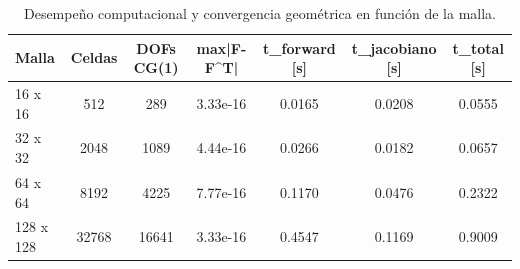 \begin{table}[htbp]
\centering
\caption{Desempeño computacional y convergencia geométrica en función de la malla.}
\label{tab:desempeno_malla}
\begin{tabular}{lcccccc}
\hline
Malla & Celdas & DOFs CG(1) & max|F-F^T| & t_forward [s] & t_jacobiano [s] & t_total [s] \\
\hline
16 x 16 & 512 & 289 & 3.33e-16 & 0.0165 & 0.0208 & 0.0555 \\
32 x 32 & 2048 & 1089 & 4.44e-16 & 0.0266 & 0.0182 & 0.0657 \\
64 x 64 & 8192 & 4225 & 7.77e-16 & 0.1170 & 0.0476 & 0.2322 \\
128 x 128 & 32768 & 16641 & 3.33e-16 & 0.4547 & 0.1169 & 0.9009 \\
\hline
\end{tabular}
\end{table}
